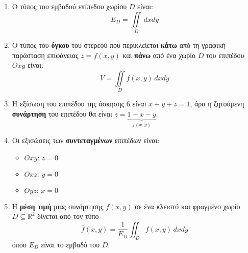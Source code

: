 \begin{enumerate}
  \item Ο τύπος του εμβαδού επίπεδου χωρίου $D$ είναι: 
    \[
      E_{D}=\iint\limits_{D}\,dxdy
    \]

  \item Ο τύπος του \textbf{όγκου} του στερεού που περικλείεται \textbf{κάτω} 
    από τη γραφική παράσταση επιφάνειας $z=f(x,y)$ και \textbf{πάνω} από ένα 
    χωρίο $D$ του επιπέδου $Oxy$ είναι: 
    \[
      V=\iint\limits_{D}f(x,y)\,dxdy
    \]

  \item Η εξίσωση του επιπέδου της άσκησης $6$ είναι $x+y+z=1$, άρα η ζητούμενη 
    \textbf{συνάρτηση} του επιπέδου θα είναι $z=\underbrace{1-x-y}_{f(x,y)}$.

  \item Οι εξισώσεις των \textbf{συντεταγμένων} επιπέδων είναι:
    \begin{itemize}
      \item $Oxy: \, z=0$
      \item $Oxz: \, y=0$
      \item $Oyz: \, x=0$
    \end{itemize}

  \item Η \textbf{μέση τιμή} μιας συνάρτησης $ f(x,y) $ σε ένα κλειστό και 
    φραγμένο χωρίο $D\subseteq \mathbb{R}^{2}$ δίνεται από τον τύπο 
    \[
      \bar{f}(x, y) = \frac{1}{E_{D}} \iint_{D}f(x,y)\,dxdy
    \]
    όπου $ E_{D} $ είναι το εμβαδό του $D$.
\end{enumerate}




